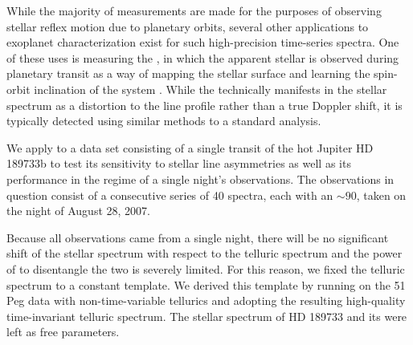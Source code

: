 \documentclass[twocolumn]{aastex62}
\begin{document}
While the majority of \EPRV measurements are made for the purposes of observing stellar reflex motion due to planetary orbits, several other applications to exoplanet characterization exist for such high-precision time-series spectra. 
One of these uses is measuring the \RM, in which the apparent stellar \RV is observed during planetary transit as a way of mapping the stellar surface and learning the spin-orbit inclination of the system \citep[e.g.][]{Queloz2000, Winn2005}. 
While the \RM technically manifests in the stellar spectrum as a distortion to the line profile rather than a true Doppler shift, it is typically detected using similar methods to a standard \RV analysis. 

We apply \wobble to a data set consisting of a single transit of the hot Jupiter HD 189733b to test its sensitivity to stellar line asymmetries as well as its performance in the regime of a single night's observations. 
The observations in question consist of a consecutive series of 40 spectra, each with an \SNR $\sim 90$, taken on the night of August 28, 2007.

Because all observations came from a single night, there will be no significant shift of the stellar spectrum with respect to the telluric spectrum and the power of \wobble to disentangle the two is severely limited. 
For this reason, we fixed the telluric spectrum to a constant template. 
We derived this template by running \wobble on the 51 Peg data with non-time-variable tellurics and adopting the resulting high-quality time-invariant telluric spectrum. 
The stellar spectrum of HD 189733 and its \RVs were left as free parameters.
\end{document}
